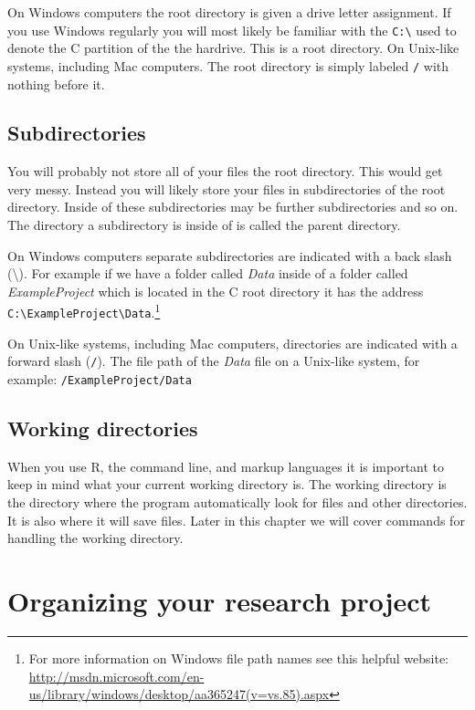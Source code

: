 {On Windows computers the root directory is given a drive letter assignment. If you use Windows regularly you will most likely be familiar with the \texttt{C:\textbackslash{}} used to denote the C partition of the the hardrive. This is a root directory. On Unix-like systems, including Mac computers. The root directory is simply labeled \texttt{/} with nothing before it.

\subsection{Subdirectories}

You will probably not store all of your files  the root directory. This would get very messy. Instead you will likely store your files in subdirectories of the root directory. Inside of these subdirectories may be further subdirectories and so on.  The directory a subdirectory is inside of is called the parent directory.

On Windows computers separate subdirectories are indicated with a back slash (\textbackslash{}). For example if we have a folder called {\emph{Data}} inside of a folder called {\emph{ExampleProject}} which is located in the C root directory it has the address \texttt{C:\textbackslash{}ExampleProject\textbackslash{}Data}.\footnote{For more information on Windows file path names see this helpful website: \url{http://msdn.microsoft.com/en-us/library/windows/desktop/aa365247(v=vs.85).aspx}} 

On Unix-like systems, including Mac computers, directories are indicated with a forward slash (\texttt{/}). The file path of the {\emph{Data}} file on a Unix-like system, for example: \texttt{/ExampleProject/Data}

\subsection{Working directories}

When you use R, the command line, and markup languages it is important to keep in mind what your current working directory is. The working directory is the directory where the program automatically look for files and other directories. It is also where it will save files. Later in this chapter we will cover commands for handling the working directory.

\section{Organizing your research project}

}
